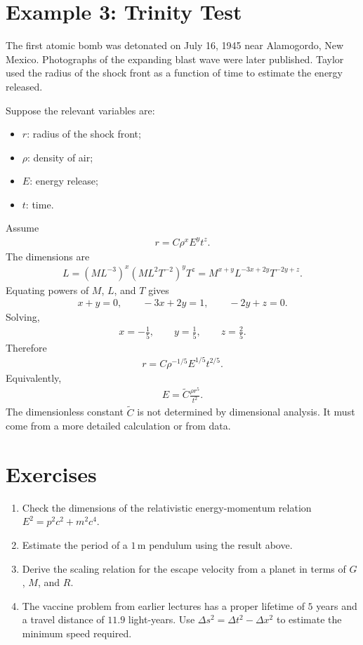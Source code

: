 \documentclass[12pt]{article}
\newcommand{\be}{\begin{eqnarray}}
\newcommand{\ee}{\end{eqnarray}}
\newif\ifshowboardquestion
\begin{document}
\section{Example 3: Trinity Test}
The first atomic bomb was detonated on July 16, 1945 near Alamogordo, New Mexico. Photographs of the expanding blast wave were later published. Taylor used the radius of the shock front as a function of time to estimate the energy released.

Suppose the relevant variables are:
\begin{itemize}
    \item $r$: radius of the shock front;
    \item $\rho$: density of air;
    \item $E$: energy release;
    \item $t$: time.
\end{itemize}
Assume
\be
r = C \rho^x E^y t^z.
\ee
The dimensions are
\be
L = (ML^{-3})^x (ML^2T^{-2})^y T^z
  = M^{x+y}L^{-3x+2y}T^{-2y+z}.
\ee
Equating powers of $M$, $L$, and $T$ gives
\be
x+y=0,\qquad -3x+2y=1,\qquad -2y+z=0.
\ee
Solving,
\be
x=-\frac{1}{5},\qquad y=\frac{1}{5},\qquad z=\frac{2}{5}.
\ee
Therefore
\be
r = C \rho^{-1/5}E^{1/5}t^{2/5}.
\ee
Equivalently,
\be
E = \tilde{C}\frac{\rho r^5}{t^2}.
\ee
The dimensionless constant $\tilde{C}$ is not determined by dimensional analysis. It must come from a more detailed calculation or from data.

\section*{Exercises}
\begin{enumerate}
    \item Check the dimensions of the relativistic energy-momentum relation $E^2=p^2c^2+m^2c^4$.
    \item Estimate the period of a $1\,\mathrm{m}$ pendulum using the result above.
    \item Derive the scaling relation for the escape velocity from a planet in terms of $G$, $M$, and $R$.
    \item The vaccine problem from earlier lectures has a proper lifetime of $5$ years and a travel distance of $11.9$ light-years. Use $\Delta s^2=\Delta t^2-\Delta x^2$ to estimate the minimum speed required.
\end{enumerate}

\ifshowboardquestion
\end{document}
